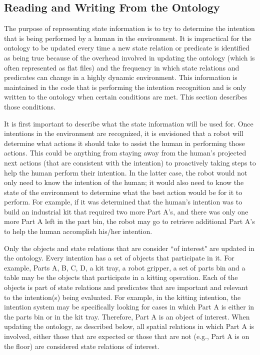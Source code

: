 \documentclass[final,1p,times]{elsarticle}
\begin{document}
\subsection{Reading and Writing From the Ontology}
The purpose of representing state information is to try to determine the intention that is being performed by a human in the environment. It is impractical for the ontology to be updated every time a new state relation or predicate is identified as being true because of the overhead involved in updating the ontology (which is often represented as flat files) and the frequency in which state relations and predicates can change in a highly dynamic environment.  This information is maintained in the code that is performing the intention recognition and is only written to the ontology when certain conditions are met. This section describes those conditions.


It is first important to describe what the state information will be used for. Once intentions in the environment are recognized, it is envisioned that a robot will determine what actions it should take to assist the human in performing those actions. This could be anything from staying away from the human's projected next actions (that are consistent with the intention) to proactively taking steps to help the human perform their intention. In the latter case, the robot would not only need to know the intention of the human; it would also need to know the state of the environment to determine what the best action would be for it to perform. For example, if it was determined that the human's intention was to build an industrial kit that required two more Part A's, and there was only one more Part A left in the part bin, the robot may go to retrieve additional Part A's to help the human accomplish his/her intention.

Only the objects and state relations that are consider ``of interest" are updated in the ontology. Every intention has a set of objects that participate in it. For example, Parts A, B, C, D, a kit tray, a robot gripper, a set of parts bin and a table may be the objects that participate in a kitting operation. Each of the objects is part of state relations and predicates that are important and relevant to the intention(s) being evaluated. For example, in the kitting intention, the intention system may be specifically looking for cases in which Part A is either in the parts bin or in the kit tray. Therefore, Part A is an object of interest. When updating the ontology, as described below, all spatial relations in which Part A is involved, either those that are expected or those that are not (e.g., Part A is on the floor) are considered state relations of interest.
\end{document}
